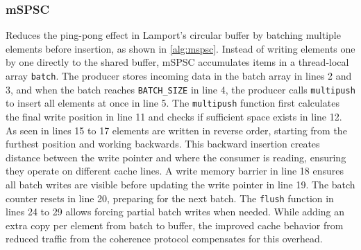 \subsubsection{\acf{mSPSC}}
Reduces the ping-pong effect in Lamport's circular buffer by batching multiple elements before insertion, as shown in \cref{alg:mspsc}. Instead of writing elements one by one directly to the shared buffer, \ac{mSPSC} accumulates items in a thread-local array \texttt{batch}. The producer stores incoming data in the batch array in lines 2 and 3, and when the batch reaches \texttt{BATCH\_SIZE} in line 4, the producer calls \texttt{multipush} to insert all elements at once in line 5. The \texttt{multipush} function first calculates the final write position in line 11 and checks if sufficient space exists in line 12. As seen in lines 15 to 17 elements are written in reverse order, starting from the furthest position and working backwards. This backward insertion creates distance between the write pointer and where the consumer is reading, ensuring they operate on different cache lines. A write memory barrier in line 18 ensures all batch writes are visible before updating the write pointer in line 19. The batch counter resets in line 20, preparing for the next batch. The \texttt{flush} function in lines 24 to 29 allows forcing partial batch writes when needed. While adding an extra copy per element from batch to buffer, the improved cache behavior from reduced traffic from the coherence protocol compensates for this overhead. \cite{torquati2010singleproducersingleconsumerqueuessharedcache}

